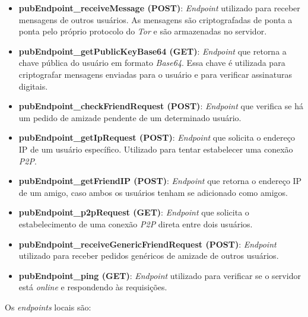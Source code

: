 \begin{itemize}
\item \textbf{pubEndpoint\_receiveMessage (POST)}: \textit{Endpoint} utilizado para receber mensagens de outros usuários. As mensagens são criptografadas de ponta a ponta pelo próprio protocolo do \textit{Tor} e são armazenadas no servidor.
\item \textbf{pubEndpoint\_getPublicKeyBase64 (GET)}: \textit{Endpoint} que retorna a chave pública do usuário em formato \textit{Base64}. Essa chave é utilizada para criptografar mensagens enviadas para o usuário e para verificar assinaturas digitais.
\item \textbf{pubEndpoint\_checkFriendRequest (POST)}: \textit{Endpoint} que verifica se há um pedido de amizade pendente de um determinado usuário.
\item \textbf{pubEndpoint\_getIpRequest (POST)}: \textit{Endpoint} que solicita o endereço IP de um usuário específico. Utilizado para tentar estabelecer uma conexão \textit{P2P}.
\item \textbf{pubEndpoint\_getFriendIP (POST)}: \textit{Endpoint} que retorna o endereço IP de um amigo, caso ambos os usuários tenham se adicionado como amigos.
\item \textbf{pubEndpoint\_p2pRequest (GET)}: \textit{Endpoint} que solicita o estabelecimento de uma conexão \textit{P2P} direta entre dois usuários.
\item \textbf{pubEndpoint\_receiveGenericFriendRequest (POST)}: \textit{Endpoint} utilizado para receber pedidos genéricos de amizade de outros usuários.
\item \textbf{pubEndpoint\_ping (GET)}: \textit{Endpoint} utilizado para verificar se o servidor está \textit{online} e respondendo às requisições.
\end{itemize}

Os \textit{endpoints} locais são:

